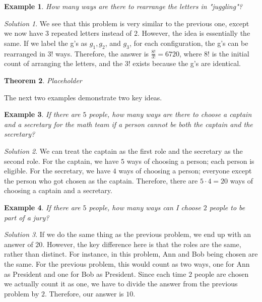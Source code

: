 \documentclass[letterpaper]{article}
\newtheorem{thm}{Theorem}[section]
\newtheorem{example}[thm]{Example}
\theoremstyle{remark}
\newtheorem*{solution}{Solution}
\theoremstyle{definition}
\begin{document}
\begin{example}
How many ways are there to rearrange the letters in "juggling"?
\end{example}

\begin{solution}
We see that this problem is very similar to the previous one, except we now have $3$ repeated letters instead of $2$. However, the idea is essentially the same. If we label the g's as $g_1, g_2$, and $g_3$, for each configuration, the g's can be rearranged in $3!$ ways. Therefore, the answer is $\frac{8!}{3!}=6720$, where $8!$ is the initial count of arranging the letters, and the $3!$ exists because the g's are identical.
\end{solution}

\begin{thm}
Placeholder
\end{thm}

The next two examples demonstrate two key ideas.

\begin{example}
If there are $5$ people, how many ways are there to choose a captain and a secretary for the math team if a person cannot be both the captain and the secretary?
\end{example}

\begin{solution}
We can treat the captain as the first role and the secretary as the second role. For the captain, we have $5$ ways of choosing a person; each person is eligible. For the secretary, we have $4$ ways of choosing a person; everyone except the person who got chosen as the captain. Therefore, there are $5\cdot 4=20 $ ways of choosing a captain and a secretary.
\end{solution}

\begin{example}
If there are $5$ people, how many ways can I choose $2$ people to be part of a jury?
\end{example}

\begin{solution}
If we do the same thing as the previous problem, we end up with an answer of $20$. However, the key difference here is that the roles are the same, rather than distinct. For instance, in this problem, Ann and Bob being chosen are the same. For the previous problem, this would count as two ways, one for Ann as President and one for Bob as President. Since each time $2$ people are chosen we actually count it as one, we have to divide the answer from the previous problem by $2$. Therefore, our answer is $10$.
\end{solution}
\end{document}
